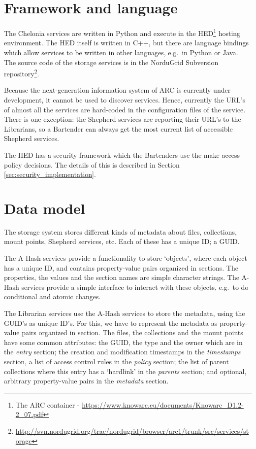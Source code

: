 \documentclass{book}
\begin{document}
\section{Framework and language} %
\label{sec:framework_and_language}

The Chelonia services are written in Python and execute in the HED\footnote{The ARC container - \url{https://www.knowarc.eu/documents/Knowarc\_D1.2-2\_07.pdf}} hosting environment. The HED itself is written in C++, but there are language bindings which allow services to be written in other languages, e.g.~in Python or Java. The source code of the storage services is in the NorduGrid Subversion repository\footnote{\url{http://svn.nordugrid.org/trac/nordugrid/browser/arc1/trunk/src/services/storage}}.

Because the next-generation information system of ARC is currently under development, it cannot be used to discover services. Hence, currently the URL's of almost all the services are hard-coded in the configuration files of the service. There is one exception: the Shepherd services are reporting their URL's to the Librarians, so a Bartender can always get the most current list of accessible Shepherd services.

The HED has a security framework which the Bartenders use the make access policy decisions. The details of this is described in Section \ref{sec:security_implementation}.


\section{Data model} %
\label{sec:data_model}

The storage system stores different kinds of metadata about files, collections, mount points, Shepherd services, etc. Each of these has a unique ID; a GUID.

The A-Hash services provide a functionality to store `objects', where each object has a unique ID, and contains property-value pairs organized in sections. The properties, the values and the section names are simple character strings. The A-Hash services provide a simple interface to interact with these objects, e.g.~to do conditional and atomic changes.

The Librarian services use the A-Hash services to store the metadata, using the GUID's as unique ID's. For this, we have to represent the metadata as property-value pairs organized in section. The files, the collections and the mount points have some common attributes: the GUID, the type and the owner which are in the \emph{entry} section; the creation and modification timestamps in the \emph{timestamps} section, a list of access control rules in the \emph{policy} section; the list of parent collections where this entry has a `hardlink' in the \emph{parents} section; and optional, arbitrary property-value pairs in the \emph{metadata} section.
\end{document}
